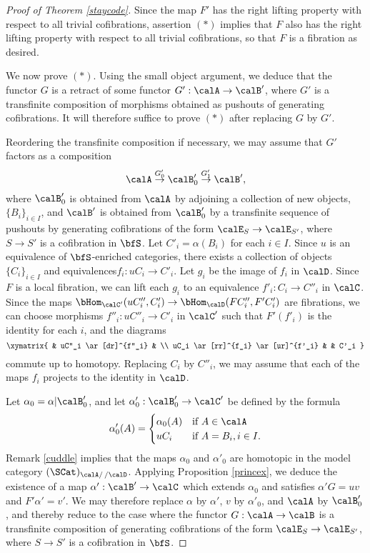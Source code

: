 \begin{proof}[Proof of Theorem \ref{staycode}]
Since the map $F'$ has the right lifting property with respect to all trivial cofibrations, 
assertion $(\ast)$ implies that $F$ also has the right lifting property with respect to all trivial cofibrations, so that $F$ is a fibration as desired.

We now prove $(\ast)$. Using the small object argument, we deduce that 
the functor $G$ is a retract of some functor $G': \calA \rightarrow \calB'$, where
$G'$ is a transfinite composition of morphisms obtained as pushouts of 
generating cofibrations. It will therefore suffice to prove $(\ast)$ after replacing $G$ by $G'$.

Reordering the transfinite composition if necessary, we may assume that $G'$ factors as a
composition
$$ \calA \stackrel{G'_0}{\rightarrow} \calB'_0 \stackrel{G'_1}{\rightarrow} \calB',$$
where $\calB'_0$ is obtained from $\calA$ by adjoining a collection of new objects,
$\{B_i \}_{i \in I}$, and $\calB'$ is obtained from $\calB'_0$ by a transfinite sequence of pushouts
by generating cofibrations of the form $\calE_{S} \rightarrow \calE_{S'}$, where
$S \rightarrow S'$ is a cofibration in $\bfS$. Let $C'_i = \alpha(B_i)$ for each $i \in I$.
Since $u$ is an equivalence of $\bfS$-enriched categories, there exists a collection
of objects $\{ C_i \}_{i \in I}$ and equivalences$f_i: u C_i \rightarrow C'_i$. 
Let $g_i$ be the image of $f_i$ in $\calD$. Since $F$ is a local fibration, 
we can lift each $g_i$ to an equivalence
$f'_i: C_i \rightarrow C''_i$ in $\calC$. 
Since the maps $\bHom_{\calC'}( uC''_i, C'_i) \rightarrow \bHom_{\calD}( FC''_i, F'C'_i)$
are fibrations, we can choose morphisms $f''_i: uC''_i \rightarrow C'_i$
in $\calC'$ such that $F'( f'_i)$ is the identity for each $i$, and the diagrams
$$ \xymatrix{ & uC''_i \ar[dr]^{f''_i} & \\
uC_i \ar[rr]^{f_i} \ar[ur]^{f'_i} & & C'_i }$$
commute up to homotopy. Replacing $C_i$ by $C''_i$, we may assume
that each of the maps $f_i$ projects to the identity in $\calD$.

Let $\alpha_0 = \alpha | \calB'_0$, and let $\alpha'_0: \calB'_0 \rightarrow \calC'$ be defined by the formula $$ \alpha'_0(A) = \begin{cases} \alpha_0(A) & \text{if } A \in \calA \\
uC_i & \text{if } A = B_i, i \in I. \end{cases}$$
Remark \ref{cuddle} implies that the maps $\alpha_0$ and
$\alpha'_0$ are homotopic in the model category
$(\SCat)_{\calA/ \, / \calD}$. Applying Proposition \ref{princex}, we deduce the existence of a map
$\alpha': \calB' \rightarrow \calC$ which extends $\alpha_0$ and satisfies
$\alpha' G = u v$ and $F' \alpha' = v'$. We may therefore replace 
$\alpha$ by $\alpha'$, $v$ by $\alpha'_0$, and $\calA$ by $\calB'_0$, and thereby
reduce to the case where the functor $G: \calA \rightarrow \calB$ is a transfinite
composition of generating cofibrations of the form $\calE_{S} \rightarrow \calE_{S'}$, where
$S \rightarrow S'$ is a cofibration in $\bfS$.


\end{proof}
